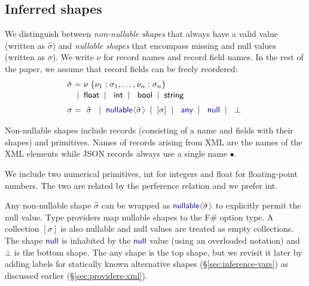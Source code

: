 \documentclass[10pt,preprint,blind,clearpagebib]{sigplanconf}
\newcommand{\langl}{\begin{picture}(4.5,7)
\put(1.1,2.5){\rotatebox{60}{\line(1,0){5.5}}}
\put(1.1,2.5){\rotatebox{300}{\line(1,0){5.5}}}
\end{picture}}
\newcommand{\rangl}{\begin{picture}(4.5,7)
\put(.9,2.5){\rotatebox{120}{\line(1,0){5.5}}}
\put(.9,2.5){\rotatebox{240}{\line(1,0){5.5}}}
\end{picture}}
\newcommand{\kvd}[1]{\textnormal{\textcolor{kvdclr}{\sffamily #1}}}
\newcommand{\ident}[1]{\textnormal{\sffamily #1}}
\newcommand{\lsep}[0]{\;\; | \;\;}
\newcommand{\narrow}[1]{\hspace{-0.7em} #1 \hspace{-0.7em}}
\begin{document}

\subsection{Inferred shapes}
\label{sec:inference-types}

We distinguish between \emph{non-nullable shapes} that always have a valid value (written as 
$\hat{\sigma}$) and \emph{nullable shapes} that encompass missing and \kvd{null} values 
(written as $\sigma$). We write $\nu$ for record names and record field names. In the rest of the
paper, we assume that record fields can be freely reordered:
%
\begin{equation*}
\begin{array}{rcl}
 \hat{\sigma} &\narrow{=}& \nu \; \{ \nu_1 : \sigma_1, \ldots, \nu_n : \sigma_n \} \\[0.1em]
                &\narrow{|}& \ident{float} \lsep \ident{int} \lsep \ident{bool} \lsep \ident{string} 
 \\[0.6em] 
       \sigma &\narrow{=}& ~\hat{\sigma}~ \lsep \kvd{nullable}\langl \hat{\sigma} \rangl \lsep [\sigma] \lsep \kvd{any} \lsep \kvd{null}  \lsep ~\bot~
\end{array}
\end{equation*}

\noindent
Non-nullable shapes include records (consisting of a name and fields with their shapes) and 
primitives. Names of records arising from XML are the names of the XML elements while
JSON records always use a single name $\bullet$.

We include two numerical primitives, \ident{int} for integers and \ident{float} for floating-point 
numbers. The two are related by the perference relation and we prefer \ident{int}.

Any non-nullable shape $\hat{\sigma}$ can be wrapped as $\kvd{nullable}\langl\hat{\sigma}\rangl$ to 
explicitly permit the \kvd{null} value. Type providers map \kvd{nullable} shapes to the F\# option
type. A collection $[\sigma]$ is also nullable and \kvd{null} values are treated as empty 
collections. The shape $\kvd{null}$ is inhabited by the $\kvd{null}$ value (using an overloaded 
notation) and $\bot$ is the bottom shape. The \kvd{any} shape is the top shape, but we revisit it 
later by adding labels for statically known alternative shapes (\S\ref{sec:inference-vars}) as 
discussed earlier (\S\ref{sec:providers-xml}).
\end{document}
